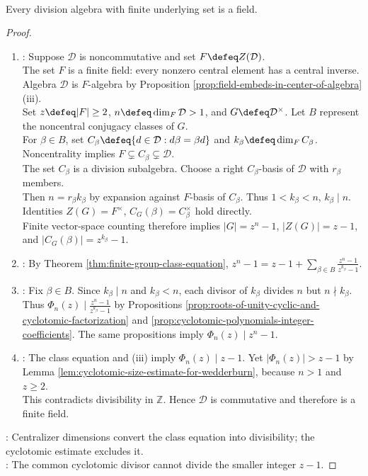 \begin{theorem} \label{thm:wedderburn-finite-division-algebra} \\
Every division algebra with finite underlying set is a field.
\begin{proof}
\begin{enumerate}[label=(\roman*)]
\setlength{\itemsep}{0pt}
\item {}: Suppose $\mathcal{D}$ is noncommutative and set $F\defeq Z(\mathcal{D})$.\\
The set $F$ is a finite field: every nonzero central element has a central inverse. Algebra $\mathcal{D}$ is $F$-algebra by Proposition \ref{prop:field-embeds-in-center-of-algebra}(iii).\\
Set $z\defeq|F|\geq2$, $n\defeq\dim_F\mathcal{D}>1$, and $G\defeq\mathcal{D}^{\times}$. Let $B$ represent the noncentral conjugacy classes of $G$.\\
For $\beta\in B$, set $C_\beta\defeq\{d\in\mathcal{D}:d\beta=\beta d\}$ and $k_\beta\defeq\dim_F C_\beta$. Noncentrality implies $F\subsetneq C_\beta\subsetneq\mathcal{D}$.\\
The set $C_\beta$ is a division subalgebra. Choose a right $C_\beta$-basis of $\mathcal{D}$ with $r_\beta$ members.\\
Then $n=r_\beta k_\beta$ by expansion against $F$-basis of $C_\beta$. Thus $1<k_\beta<n$, $k_\beta\mid n$. Identities $Z(G)=F^\times$, $C_G(\beta)=C_\beta^\times$ hold directly.\\
Finite vector-space counting therefore implies $|G|=z^n-1$, $|Z(G)|=z-1$, and $|C_G(\beta)|=z^{k_\beta}-1$.
\item {}: By Theorem \ref{thm:finite-group-class-equation}, $z^n-1=z-1+\sum\limits_{\beta\in B}\frac{z^n-1}{z^{k_\beta}-1}$.
\item {}: Fix $\beta\in B$. Since $k_\beta\mid n$ and $k_\beta<n$, each divisor of $k_\beta$ divides $n$ but $n\nmid k_\beta$.\\
Thus $\Phi_n(z)\mid\frac{z^n-1}{z^{k_\beta}-1}$ by Propositions \ref{prop:roots-of-unity-cyclic-and-cyclotomic-factorization} and \ref{prop:cyclotomic-polynomials-integer-coefficients}. The same propositions imply $\Phi_n(z)\mid z^n-1$.
\item {}: The class equation and (iii) imply $\Phi_n(z)\mid z-1$. Yet $|\Phi_n(z)|>z-1$ by Lemma \ref{lem:cyclotomic-size-estimate-for-wedderburn}, because $n>1$ and $z\geq2$.\\
This contradicts divisibility in $\mathbb{Z}$. Hence $\mathcal{D}$ is commutative and therefore is a finite field.
\end{enumerate}
: Centralizer dimensions convert the class equation into divisibility; the cyclotomic estimate excludes it.\\
: The common cyclotomic divisor cannot divide the smaller integer $z-1$.
\end{proof}
\end{theorem}

